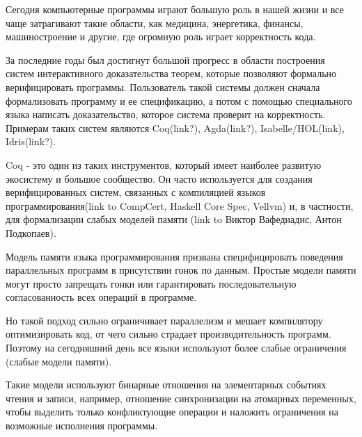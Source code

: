\documentclass[times
              ]{itmo-student-thesis}
\begin{document}

\tableofcontents

\startprefacepage



Сегодня компьютерные программы играют большую роль в нашей жизни и все чаще затрагивают такие области, как медицина, энергетика, финансы, машиностроение и другие, где огромную роль играет корректность кода.

За последние годы был достигнут большой прогресс в области построения систем интерактивного доказательства теорем, которые позволяют формально верифицировать программы.
Пользователь такой системы должен сначала формализовать программу и ее спецификацию, а потом с помощью специального языка написать доказательство, которое система проверит на корректность.
Примерам таких систем являются Coq(link?), Agda(link?), Isabelle/HOL(link), Idris(link?).

Coq - это один из таких инструментов, который имеет наиболее развитую экосистему и большое сообщество.
Он часто используется для создания верифицированных систем, связанных с компиляцией языков программирования(link to CompCert, Haskell Core Spec, Vellvm) и, в частности, для формализации слабых моделей памяти (link to Виктор Вафедиадис, Антон Подкопаев).

Модель памяти языка программирования призвана специфицировать поведения параллельных программ в присутствии гонок по данным.
Простые модели памяти могут просто запрещать гонки или гарантировать последовательную согласованность всех операций в программе.

Но такой подход сильно ограничивает параллелизм и мешает компилятору оптимизировать код, от чего сильно страдает производительность программ.
Поэтому на сегодняшний день все языки используют более слабые ограничения (слабые модели памяти).

Такие модели используют бинарные отношения на элементарных событиях чтения и записи, например, отношение синхронизации на атомарных переменных, чтобы выделить только конфликтующие операции и наложить ограничения на возможные исполнения программы.
\end{document}
